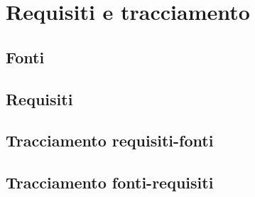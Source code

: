 \section{Requisiti e tracciamento}

\subsection{Fonti}


\subsection{Requisiti}


\subsection{Tracciamento requisiti-fonti}


\subsection{Tracciamento fonti-requisiti}
